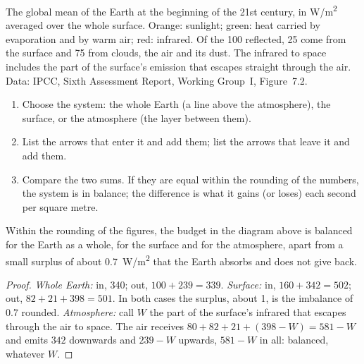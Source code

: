\begin{omfigure}
{\small The global mean  of the Earth at the beginning of the
21st century, in \unit{W/m^2} averaged over the whole surface. Orange:
sunlight; green: heat carried by evaporation and by warm air; red: infrared.
Of the 100 reflected, 25 come from the surface and 75 from clouds, the air
and its dust. The infrared to space includes the part of the surface's
emission that escapes straight through the air. Data: IPCC, Sixth Assessment
Report, Working Group~I, Figure~7.2.}
\end{omfigure}

\begin{method}\label{met:g10:earth-energy-budget:reading}
\begin{enumerate}
  \item Choose the system: the whole Earth (a line above the atmosphere),
        the surface, or the atmosphere (the layer between them).
  \item List the arrows that enter it and add them; list the arrows that
        leave it and add them.
  \item Compare the two sums. If they are equal within the rounding of the
        numbers, the system is in balance; the difference is what it gains
        (or loses) each second per square metre.
\end{enumerate}
\end{method}

\begin{proposition}\label{prop:g10:earth-energy-budget:balance}
Within the rounding of the figures, the budget in the diagram
above is balanced for the Earth as a
whole, for the surface and for the atmosphere, apart from a small surplus of
about \qty{0.7}{W/m^2} that the Earth absorbs and does not give back.
\end{proposition}

\begin{proof}
\emph{Whole Earth:} in, 340; out, $100 + 239 = 339$. \emph{Surface:} in,
$160 + 342 = 502$; out, $82 + 21 + 398 = 501$. In both cases the surplus,
about 1, is the imbalance of 0.7 rounded. \emph{Atmosphere:} call $W$ the
part of the surface's infrared that escapes through the air to space. The air
receives $80 + 82 + 21 + (398 - W) = 581 - W$ and emits $342$ downwards and
$239 - W$ upwards, $581 - W$ in all: balanced, whatever $W$.
\end{proof}

